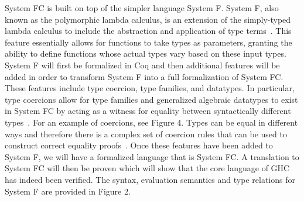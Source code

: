 \documentclass{sig-alternate}
\begin{document}
System FC is built on top of the simpler language System F. System F, also known as the polymorphic lambda calculus, is an extension of the simply-typed lambda calculus to include the abstraction and application of type terms~\cite{Pierce:TAPL}. This feature essentially allows for functions to take types as parameters, granting the ability to define functions whose actual types vary based on these input types. System F will first be formalized in Coq and then additional features will be added in order to transform System F into a full formalization of System FC. These features include type coercion, type families, and datatypes. In particular, type coercions allow for type families and generalized algebraic datatypes to exist in System FC by acting as a witness for equality between syntactically different types~\cite{DBLP:conf/rta/VytiniotisJ13}. For an example of coercions, see Figure 4. Types can be equal in different ways and therefore there is a complex set of coercion rules that can be used to construct correct equality proofs~\cite{Breitner:2014:SZC:2628136.2628141}.  Once these features have been added to System F, we will have a formalized language that is System FC. A translation to System FC will then be proven which will show that the core language of GHC has indeed been verified. The syntax, evaluation semantics and type relations for System F are provided in Figure 2.\vspace{1cm}\\
\newcommand\mybox[2][]{#2}%
\\
\end{document}
